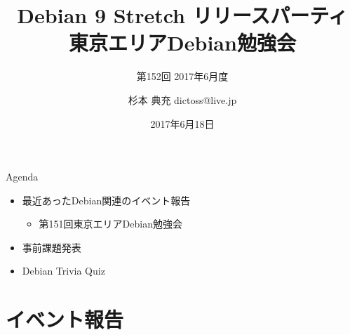 \title{Debian 9 Stretch リリースパーティ \\ 東京エリアDebian勉強会}
\subtitle{第152回 2017年6月度}
\author{杉本 典充  dictoss@live.jp}
\date{2017年6月18日}



\begin{frame}
\titlepage{}
\end{frame}

\begin{frame}{Agenda}
 \begin{minipage}[t]{0.45\hsize}
  \begin{itemize}
  \item 最近あったDebian関連のイベント報告
	\begin{itemize}
	\item 第151回東京エリアDebian勉強会
	\end{itemize}
  \item 事前課題発表
  \end{itemize}
 \end{minipage}
 \begin{minipage}[t]{0.45\hsize}
  \begin{itemize}
   \item Debian Trivia Quiz
  \end{itemize}
 \end{minipage}
\end{frame}

\section{イベント報告}

